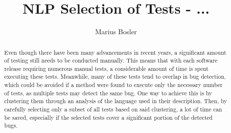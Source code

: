 \documentclass[runningheads]{llncs}
\begin{document}
\title{NLP Selection of Tests - ...}
\author{Marius Bosler}
%
\maketitle %
%
%
\begin{abstract}
Even though there have been many advancements in recent years, a significant amount of testing still needs to be conducted manually. This means that with each software release requiring numerous manual tests, a considerable amount of time is spent executing these tests. Meanwhile, many of these tests tend to overlap in bug detection, which could be avoided if a method were found to execute only the necessary number of tests, as multiple tests may detect the same bug. One way to achieve this is by clustering them through an analysis of the language used in their description. Then, by carefully selecting only a subset of all tests based on said clustering, a lot of time can be saved, especially if the selected tests cover a significant portion of the detected bugs.

\end{abstract}
%
%







%
%


%
\end{document}
